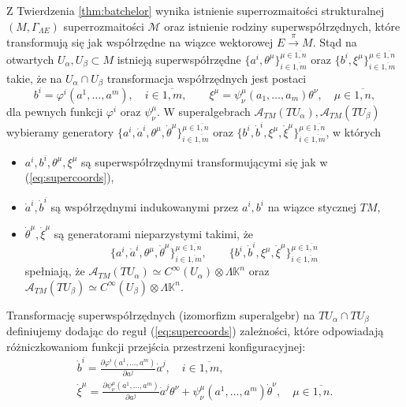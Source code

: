 \documentclass[11pt,a4paper]{report}
\theoremstyle{definition}
\begin{document}
Z Twierdzenia \ref{thm:batchelor} wynika istnienie superrozmaitości strukturalnej $(M, \Gamma_{\Lambda E})$ superrozmaitości $\mathcal{M}$ oraz istnienie rodziny superwspółrzędnych, które transformują się jak współrzędne na wiązce wektorowej $E \stackrel{\pi}{\rightarrow} M$. Stąd na otwartych $U_\alpha, U_\beta \subset M$ istnieją superwspółrzędne $\{a^i, \theta^\mu \}^{\mu \in \overline{1,n}} _{i \in \overline{1,m}}$ oraz $\{b^i, \xi^\mu \}^{\mu \in \overline{1,n}} _{i \in \overline{1,m}}$ takie, że na $U_\alpha \cap U_\beta$ transformacja współrzędnych jest postaci
\begin{equation}
\label{eq:supercoords}
b^i = \varphi^i(a^1, \ldots, a^m), \quad i \in \overline{1,m}, \qquad
\xi^\mu = \psi_\nu^\mu(a_1, \ldots, a_m) \theta^\nu, \quad \mu \in \overline{1,n},
\end{equation}
dla pewnych  funkcji $\varphi^i$ oraz $\psi^\mu _\nu$. W superalgebrach $\mathcal{A}_{TM}(TU_\alpha), \mathcal{A}_{TM}(TU_\beta)$ wybieramy generatory $\{a^i, \dot{a}^i, \theta^\mu, \dot{\theta}^\mu \}^{\mu \in \overline{1,n}} _{i \in \overline{1,m}}$ oraz $\{b^i, \dot{b}^i, \xi^\mu, \dot{\xi}^\mu \}^{\mu \in \overline{1,n}} _{i \in \overline{1,m}}$, w których 
\begin{itemize}
 \item $a^i, b^i, \theta^\mu, \xi^\mu$ są superwspółrzędnymi transformującymi się jak w (\ref{eq:supercoords}),
 \item $\dot{a}^i, \dot{b}^i$ są współrzędnymi indukowanymi przez $a^i, b^i$ na wiązce stycznej $TM$,
 \item $\dot{\theta}^\mu, \dot{\xi}^\mu$ są generatorami nieparzystymi takimi, że$$ \{ a^i, \dot{a}^i, \theta^\mu, \dot{\theta}^\mu \}^{\mu \in \overline{1,n}} _{i \in \overline{1,m}},\qquad \{ b^i, \dot{b}^i, \xi^\mu, \dot{\xi}^\mu \}^{\mu \in \overline{1,n}} _{i \in \overline{1,m}}$$ spełniają, że $\mathcal{A}_{TM}(TU_\alpha)\simeq C^\infty(U_\alpha) \otimes \Lambda \mathbb{K}^n$ oraz $\mathcal{A}_{TM}(TU_\beta) \simeq C^\infty(U_\beta)\otimes \Lambda \mathbb{K}^n$.
\end{itemize}
Transformację superwspółrzędnych (izomorfizm superalgebr) na $TU_\alpha \cap TU_\beta$ definiujemy dodając do reguł (\ref{eq:supercoords}) zależności, które odpowiadają różniczkowaniom funkcji przejścia przestrzeni konfiguracyjnej:
\begin{equation}
\begin{gathered}
\dot{b}^i = \frac{\partial \varphi^i (a^1, \ldots, a^m)}{\partial a^j} \dot{a}^j, \quad i \in \overline{1,m}, \\
\dot{\xi}^\mu = \frac{\partial \psi^\mu_\nu(a^1, \ldots, a^m)}{\partial a^j} \dot{a}^j \theta^\nu + \psi^\mu_\nu(a^1, \ldots, a^m) \dot{\theta}^\nu, \quad \mu \in \overline{1,n}.
\end{gathered}
\end{equation}
\end{document}

